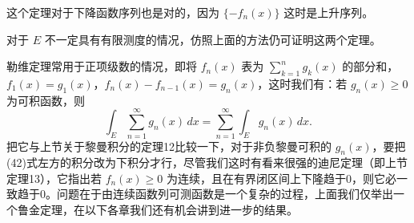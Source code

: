 这个定理对于下降函数序列也是对的，因为 $\{-f_n(x)\}$ 这时是上升序列。

对于 $E$ 不一定具有有限测度的情况，仿照上面的方法仍可证明这两个定理。

勒维定理常用于正项级数的情况，即将 $f_n(x)$ 表为 $\sum_{k=1}^{n}g_k(x)$ 的部分和，$f_1(x)=g_1(x)$，$f_n(x)-f_{n-1}(x)=g_n(x)$，这时我们有：若 $g_n(x)\ge0$ 为可积函数，则
\begin{equation}
 \int_E\sum_{n=1}^{\infty}g_n(x)\,dx
 =\sum_{n=1}^{\infty}\int_Eg_n(x)\,dx.
 \tag{42}
\end{equation}
把它与上节关于黎曼积分的定理12比较一下，对于非负黎曼可积的 $g_n(x)$，要把(42)式左方的积分改为下积分才行，尽管我们这时有看来很强的迪尼定理（即上节定理13），它指出若 $f_n(x)\ge0$ 为连续，且在有界闭区间上下隆趋于0，则它必一致趋于0。问题在于由连续函数列可测函数是一个复杂的过程，上面我们仅举出一个鲁金定理，在以下各章我们还有机会讲到进一步的结果。
